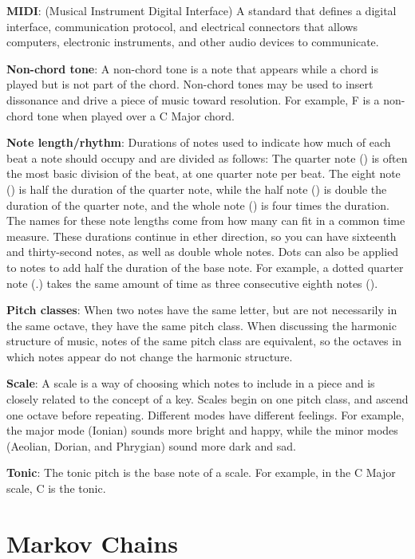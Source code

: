 \textbf{MIDI}: (Musical Instrument Digital Interface) A standard that defines a digital interface, communication protocol, and electrical connectors that allows computers, electronic instruments, and other audio devices to communicate.

\textbf{Non-chord tone}: A non-chord tone is a note that appears while a chord is played but is not part of the chord.
Non-chord tones may be used to insert dissonance and drive a piece of music toward resolution.
For example, F is a non-chord tone when played over a C Major chord.


\textbf{Note length/rhythm}: Durations of notes used to indicate how much of each beat a note should occupy and are divided as follows:
The quarter note (\quarternote) is often the most basic division of the beat, at one quarter note per beat.
The eight note (\eighthnote) is half the duration of the quarter note, while the half note (\halfnote) is double the duration of the quarter note, and the whole note (\fullnote) is four times the duration.
The names for these note lengths come from how many can fit in a common time measure.
These durations continue in ether direction, so you can have sixteenth and thirty-second notes, as well as double whole notes.
Dots can also be applied to notes to add half the duration of the base note.
For example, a dotted quarter note (\quarternote.) takes the same amount of time as three consecutive eighth notes (\eighthnote \eighthnote \eighthnote).


\textbf{Pitch classes}: When two notes have the same letter, but are not necessarily in the same octave, they have the same pitch class.
When discussing the harmonic structure of music, notes of the same pitch class are equivalent, so the octaves in which notes appear do not change the harmonic structure.

\textbf{Scale}: A scale is a way of choosing which notes to include in a piece and is closely related to the concept of a key.
Scales begin on one pitch class, and ascend one octave before repeating.
Different modes have different feelings.
For example, the major mode (Ionian) sounds more bright and happy, while the minor modes (Aeolian, Dorian, and Phrygian) sound more dark and sad.

\textbf{Tonic}: The tonic pitch is the base note of a scale.
For example, in the C Major scale, C is the tonic.

\section[Markov Chains]{Markov Chains} \label{bg:markov}

